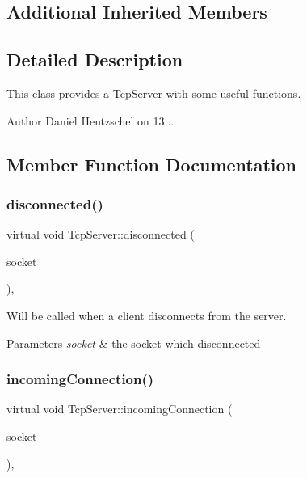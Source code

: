 \subsection*{Additional Inherited Members}


\subsection{Detailed Description}
This class provides a \mbox{\hyperlink{class_tcp_server}{Tcp\+Server}} with some useful functions. 

\begin{DoxyAuthor}{Author}
Daniel Hentzschel on 13... 
\end{DoxyAuthor}


\subsection{Member Function Documentation}
\mbox{\label{class_tcp_server_aa46b3b62f38d3ff8c6ad122e6201c094}} 
\subsubsection{\texorpdfstring{disconnected()}{disconnected()}}
{\footnotesize\ttfamily virtual void Tcp\+Server\+::disconnected (\begin{DoxyParamCaption}\item[{const \mbox{\hyperlink{class_tcp_socket}{Tcp\+Socket}} \&}]{socket }\end{DoxyParamCaption})\hspace{0.3cm}{\ttfamily [protected]}, {}}



Will be called when a client disconnects from the server. 


\begin{DoxyParams}{Parameters}
{\em socket} & the socket which disconnected \\
\hline
\end{DoxyParams}
\mbox{\label{class_tcp_server_ad1e57837a4b59e4c1b48871bb079ebb5}} 
\subsubsection{\texorpdfstring{incomingConnection()}{incomingConnection()}}
{\footnotesize\ttfamily virtual void Tcp\+Server\+::incoming\+Connection (\begin{DoxyParamCaption}\item[{const \mbox{\hyperlink{class_tcp_socket}{Tcp\+Socket}} \&}]{socket }\end{DoxyParamCaption})\hspace{0.3cm}{\ttfamily [protected]}, {}}



